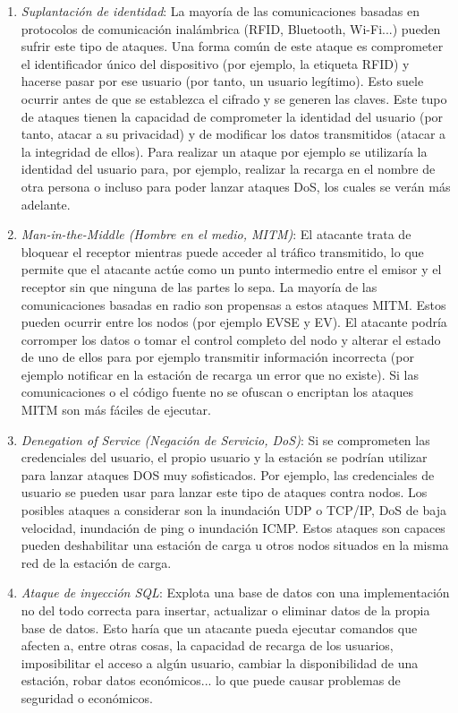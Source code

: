 \documentclass[12pt,a4paper,onecolumn,oneside]{report}
\begin{document}
\begin{enumerate}

\item \textit{Suplantación de identidad}: La mayoría de las comunicaciones basadas en protocolos de comunicación inalámbrica (RFID, Bluetooth, Wi-Fi...) pueden sufrir este tipo de ataques. Una forma común de este ataque es comprometer el identificador único del dispositivo (por ejemplo, la etiqueta RFID) y hacerse pasar por ese usuario (por tanto, un usuario legítimo). Esto suele ocurrir antes de que se establezca el cifrado y se generen las claves. Este tupo de ataques tienen la capacidad de comprometer la identidad del usuario (por tanto, atacar a su privacidad) y de modificar los datos transmitidos (atacar a la integridad de ellos). Para realizar un ataque por ejemplo se utilizaría la identidad del usuario para, por ejemplo, realizar la recarga en el nombre de otra persona o incluso para poder lanzar ataques DoS, los cuales se verán más adelante.

\item \textit{Man-in-the-Middle (Hombre en el medio, MITM)}:  El atacante trata de bloquear el receptor mientras puede acceder al tráfico transmitido, lo que permite que el atacante actúe como un punto intermedio entre el emisor y el receptor sin que ninguna de las partes lo sepa. La mayoría de las comunicaciones basadas en radio son propensas a estos ataques MITM. Estos pueden ocurrir entre los nodos (por ejemplo EVSE y EV). El atacante podría corromper los datos o tomar el control completo del nodo y alterar el estado de uno de ellos para por ejemplo transmitir información incorrecta (por ejemplo notificar en la estación de recarga un error que no existe). Si las comunicaciones o el código fuente no se ofuscan o encriptan los ataques MITM son más fáciles de ejecutar.

\item \textit{Denegation of Service (Negación de Servicio, DoS)}: Si se comprometen las credenciales del usuario, el propio usuario y la estación se podrían utilizar para lanzar ataques DOS muy sofisticados. Por ejemplo, las credenciales de usuario se pueden usar para lanzar este tipo de ataques contra nodos. Los posibles ataques a considerar son la inundación UDP o TCP/IP, DoS de baja velocidad, inundación de ping o inundación ICMP. Estos ataques son capaces pueden deshabilitar una estación de carga u otros nodos situados en la misma red de la estación de carga.

\item \textit{Ataque de inyección SQL}: Explota una base de datos con una implementación no del todo correcta para insertar, actualizar o eliminar datos de la propia base de datos. Esto haría que un atacante pueda ejecutar comandos que afecten a, entre otras cosas, la capacidad de recarga de los usuarios, imposibilitar el acceso a algún usuario, cambiar la disponibilidad de una estación, robar datos económicos... lo que puede causar problemas de seguridad o económicos.


\end{enumerate}
\end{document}
